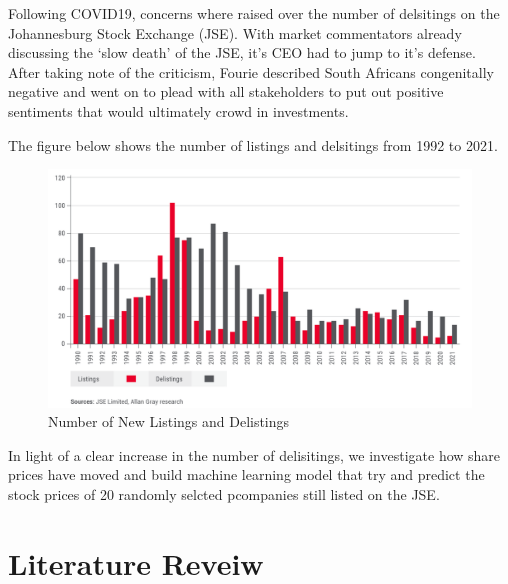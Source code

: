 \documentclass[
]{article}
\begin{document}
Following COVID19, concerns where raised over the number of delsitings
on the Johannesburg Stock Exchange (JSE). With market commentators
already discussing the `slow death' of the JSE, it's CEO had to jump to
it's defense. After taking note of the criticism, Fourie described South
Africans congenitally negative and went on to plead with all
stakeholders to put out positive sentiments that would ultimately crowd
in investments.

The figure below shows the number of listings and delsitings from 1992
to 2021.

\begin{figure}
\centering
\includegraphics{delist.png}
\caption{Number of New Listings and Delistings}
\end{figure}

In light of a clear increase in the number of delisitings, we
investigate how share prices have moved and build machine learning model
that try and predict the stock prices of 20 randomly selcted pcompanies
still listed on the JSE.

\hypertarget{literature-reveiw}{%
\section{Literature Reveiw}\label{literature-reveiw}}
\end{document}
